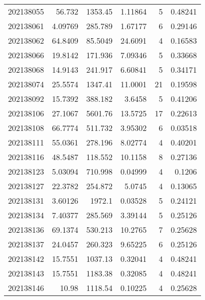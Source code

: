 \begin{tabular}{rrrrrr}
 202138055 &         56.732   &     1353.45   &            1.11864 &           5 & 0.48241 \\
 202138061 &          4.09769 &      285.789  &            1.67177 &           6 & 0.29146 \\
 202138062 &         64.8409  &       85.5049 &           24.6091  &           4 & 0.16583 \\
 202138066 &         19.8142  &      171.936  &            7.09346 &           5 & 0.33668 \\
 202138068 &         14.9143  &      241.917  &            6.60841 &           5 & 0.34171 \\
 202138074 &         25.5574  &     1347.41   &           11.0001  &          21 & 0.19598 \\
 202138092 &         15.7392  &      388.182  &            3.6458  &           5 & 0.41206 \\
 202138106 &         27.1067  &     5601.76   &           13.5725  &          17 & 0.22613 \\
 202138108 &         66.7774  &      511.732  &            3.95302 &           6 & 0.03518 \\
 202138111 &         55.0361  &      278.196  &            8.02774 &           4 & 0.40201 \\
 202138116 &         48.5487  &      118.552  &           10.1158  &           8 & 0.27136 \\
 202138123 &          5.03094 &      710.998  &            0.04999 &           4 & 0.1206  \\
 202138127 &         22.3782  &      254.872  &            5.0745  &           4 & 0.13065 \\
 202138131 &          3.60126 &     1972.1    &            0.03528 &           5 & 0.24121 \\
 202138134 &          7.40377 &      285.569  &            3.39144 &           5 & 0.25126 \\
 202138136 &         69.1374  &      530.213  &           10.2765  &           7 & 0.25628 \\
 202138137 &         24.0457  &      260.323  &            9.65225 &           6 & 0.25126 \\
 202138142 &         15.7551  &     1037.13   &            0.32041 &           4 & 0.48241 \\
 202138143 &         15.7551  &     1183.38   &            0.32085 &           4 & 0.48241 \\
 202138146 &         10.98    &     1118.54   &            0.10225 &           4 & 0.25628 \\

\end{tabular}
